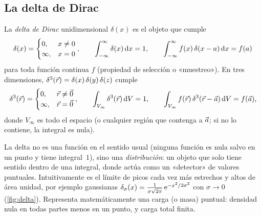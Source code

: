 \subsection{La delta de Dirac}\label{sec:delta}
\begin{definicion}\label{def:delta}
La \emph{delta de Dirac} unidimensional $\delta(x)$ es el objeto que cumple
\begin{equation}\label{eq:delta1d}
  \delta(x)=\begin{cases}0,&x\neq0\\ \infty,&x=0\end{cases},
  \qquad
  \int_{-\infty}^{\infty}\delta(x)\,\mathrm{d} x=1,
  \qquad
  \int_{-\infty}^{\infty}f(x)\,\delta(x-a)\,\mathrm{d} x=f(a)
\end{equation}
para toda función continua $f$ (propiedad de selección o «muestreo»). En tres
dimensiones, $\delta^{3}(\vec{r})=\delta(x)\,\delta(y)\,\delta(z)$ cumple
\begin{equation}\label{eq:delta3d}
  \delta^{3}(\vec{r})=\begin{cases}0,&\vec{r}\neq\vec{0}\\ \infty,&\vec{r}=\vec{0}\end{cases},
  \qquad
  \int_{V_\infty}\delta^{3}(\vec{r})\,\mathrm{d} V=1,
  \qquad
  \int_{V_\infty}f(\vec{r})\,\delta^{3}(\vec{r}-\vec{a})\,\mathrm{d} V=f(\vec{a}),
\end{equation}
donde $V_\infty$ es todo el espacio (o cualquier región que contenga a
$\vec{a}$; si no lo contiene, la integral es nula).
\end{definicion}

\begin{observacion}\label{obs:delta}
La delta no es una función en el sentido usual (ninguna función es nula salvo
en un punto y tiene integral~$1$), sino una \emph{distribución}: un objeto que
solo tiene sentido dentro de una integral, donde actúa como un «detector» de
valores puntuales. Intuitivamente es el límite de picos cada vez más estrechos y
altos de área unidad, por ejemplo gaussianas
$\delta_\sigma(x)=\tfrac{1}{\sigma\sqrt{2\pi}}\,\mathrm{e}^{-x^{2}/2\sigma^{2}}$ con
$\sigma\to0$ (\cref{fig:delta}). Representa matemáticamente una carga (o masa)
puntual: densidad nula en todas partes menos en un punto, y carga total finita.
\end{observacion}



